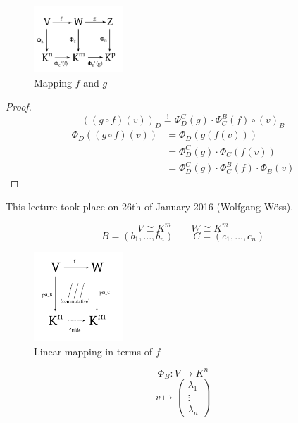 \documentclass[a4paper,landscape,twocolumn]{article}
\newcommand\meta[3]{This #1 took place on #2 (#3).\par}
\begin{document}
\begin{figure}[!h]
  \begin{center}
    \includegraphics[width=0.3\textwidth]{img/two_linear_mappings.pdf}
    \caption{Mapping $f$ and $g$}
    \label{img:two-linear-mappings}
  \end{center}
\end{figure}

\begin{proof}
  \[ ((g \circ f) (v))_D \overset!= \Phi_D^C(g) \cdot  \Phi_C^B(f) \circ (v)_B \]
  \begin{align*}
    \Phi_D((g \circ f)(v)) &= \Phi_D(g(f(v))) \\
      &= \Phi_D^C(g) \cdot \Phi_C(f(v)) \\
      &= \Phi_D^C(g) \cdot \Phi_C^B(f) \cdot \Phi_B(v)
  \end{align*}
\end{proof}

\meta{lecture}{26th of January 2016}{Wolfgang Wöss}

\[ V \cong K^m \qquad W \cong K^m \]
\[ B = (b_1, \ldots, b_n)  \qquad  C = (c_1, \ldots, c_n)  \]

\begin{figure}[t]
  \begin{center}
    \includegraphics[width=0.3\textwidth]{img/linear_mapping.pdf}
    \caption{Linear mapping in terms of $f$}
    \label{img:lm}
  \end{center}
\end{figure}

\[ \Phi_B:  V \to K^n \]
\[ v \mapsto \begin{pmatrix} \lambda_1 \\ \vdots \\ \lambda_n \end{pmatrix} \]
\end{document}
